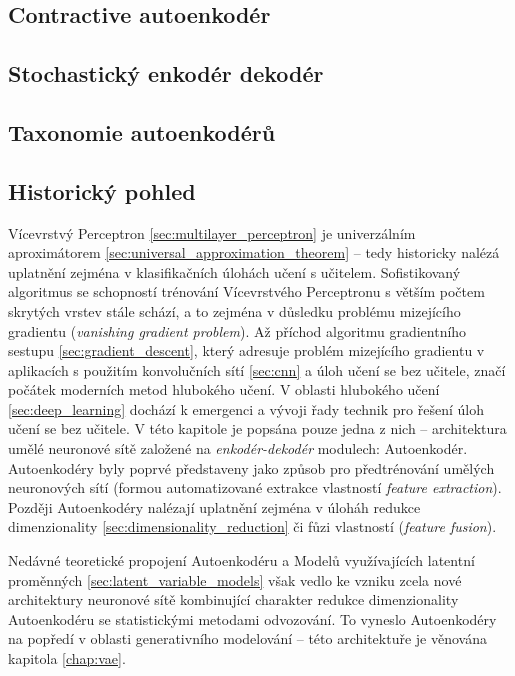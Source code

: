 \subsection{Contractive autoenkodér}

\subsection{Stochastický enkodér dekodér}

\subsection{Taxonomie autoenkodérů}

\subsection{Historický pohled}
Vícevrstvý Perceptron \autoref{sec:multilayer_perceptron} je univerzálním aproximátorem \autoref{sec:universal_approximation_theorem} – tedy historicky nalézá uplatnění zejména v klasifikačních úlohách učení s učitelem.
Sofistikovaný algoritmus se schopností trénování Vícevrstvého Perceptronu s větším počtem skrytých vrstev stále schází, a to zejména v důsledku problému mizejícího gradientu (\emph{vanishing gradient problem}).
Až příchod algoritmu gradientního sestupu \autoref{sec:gradient_descent}, který adresuje problém mizejícího gradientu v aplikacích s použitím konvolučních sítí \autoref{sec:cnn} a úloh učení se bez učitele, značí počátek moderních metod hlubokého učení.
V oblasti hlubokého učení \autoref{sec:deep_learning} dochází k emergenci a vývoji řady technik pro řešení úloh učení se bez učitele.
V této kapitole je popsána pouze jedna z nich – architektura umělé neuronové sítě založené na \emph{enkodér-dekodér} modulech: Autoenkodér.
Autoenkodéry byly poprvé představeny jako způsob pro předtrénování umělých neuronových sítí (formou automatizované extrakce vlastností \emph{feature extraction}). 
Později Autoenkodéry nalézají uplatnění zejména v úloháh redukce dimenzionality \autoref{sec:dimensionality_reduction} či fůzi vlastností (\emph{feature fusion}).


Nedávné teoretické propojení Autoenkodéru a Modelů využívajících latentní proměnných \autoref{sec:latent_variable_models} však vedlo ke vzniku zcela nové architektury neuronové sítě kombinující charakter redukce dimenzionality Autoenkodéru se statistickými metodami odvozování.
To vyneslo Autoenkodéry na popředí v oblasti generativního modelování – této architektuře je věnována kapitola \autoref{chap:vae}.

